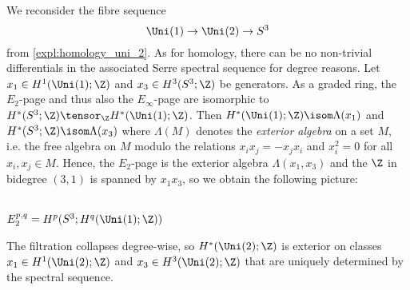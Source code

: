 \begin{example}
	We reconsider the fibre sequence
	\begin{equation*}
		\Uni(1) \to \Uni(2) \to S^3
	\end{equation*}
	from \ref{expl:homology_uni_2}. 
	As for homology, there can be no non-trivial differentials in the associated Serre spectral sequence for degree reasons.
	Let $x_1 \in H^1(\Uni(1); \Z)$ and $x_3 \in H^3(S^3; \Z)$ be generators.
	As a graded ring, the $E_2$-page and thus also the $E_\infty$-page are isomorphic to $H^*(S^3; \Z) \tensor_{\Z} H^*(\Uni(1); \Z)$.
	Then $H^*(\Uni(1); \Z) \isom \Lambda(x_1)$ and $H^*(S^3; \Z) \isom \Lambda(x_3)$ where $\Lambda(M)$ denotes the \emph{exterior algebra} on a set $M$, i.e. the free algebra on $M$ modulo the relations $x_i x_j = -x_j x_i$ and $x_i^2 = 0$ for all $x_i, x_j \in M$.
	Hence, the $E_2$-page is the exterior algebra $\Lambda(x_1, x_3)$ and the $\Z$ in bidegree $(3, 1)$ is spanned by $x_1 x_3$, so we obtain the following picture:
	\begin{center}
		 \\
		$E_2^{p, q} = H^p(S^3; H^q(\Uni(1); \Z))$
	\end{center}
	The filtration collapses degree-wise, so $H^*(\Uni(2); \Z)$ is exterior on classes $x_1 \in H^1(\Uni(2); \Z)$ and $x_3 \in H^3(\Uni(2); \Z)$ that are uniquely determined by the spectral sequence.
\end{example}
